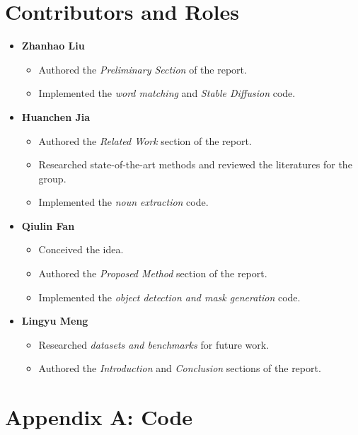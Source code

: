 \documentclass[11pt,letterpaper]{article}
\begin{document}
\section{Contributors and Roles}
\begin{itemize}
    \item \textbf{Zhanhao Liu} 
    \begin{itemize}
        \item Authored the \emph{Preliminary Section} of the report.
        \item Implemented the \emph{word matching} and \emph{Stable Diffusion} code.
    \end{itemize}
    \item \textbf{Huanchen Jia} 
    \begin{itemize}
        \item Authored the \emph{Related Work} section of the report.
        \item Researched state-of-the-art methods and reviewed the literatures for the group.
        \item Implemented the \emph{noun extraction} code.
    \end{itemize}
    \item \textbf{Qiulin Fan} 
    \begin{itemize}
        \item Conceived the idea.
        \item Authored the \emph{Proposed Method} section of the report.
        \item Implemented the \emph{object detection and mask generation} code.
    \end{itemize}
    \item \textbf{Lingyu Meng} 
    \begin{itemize}
        \item Researched \emph{datasets and benchmarks} for future work.
        \item Authored the \emph{Introduction} and \emph{Conclusion} sections of the report.
    \end{itemize}
\end{itemize}

\printbibliography


\appendix
\section*{Appendix A: Code}
\end{document}
